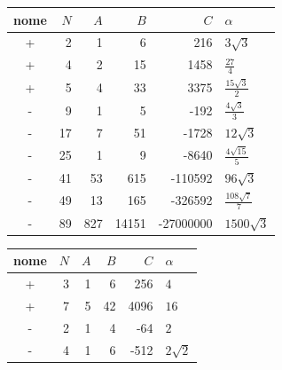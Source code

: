 \begin{identitytable}\centering\small
\caption{Standard level 3 identities, normalized by $B>0$.}
\label{tab:standard3}
\setlength{\tabcolsep}{4pt}
\renewcommand{\arraystretch}{1.15}
\begin{tabular}{@{}crrrrl@{}}\toprule
nome & $N$ & $A$ & $B$ & $C$ & $\alpha$\\\midrule
+&2&1&6&216&$3 \sqrt{3}$\\
+&4&2&15&1458&$\frac{27}{4}$\\
+&5&4&33&3375&$\frac{15 \sqrt{3}}{2}$\\
-&9&1&5&-192&$\frac{4 \sqrt{3}}{3}$\\
-&17&7&51&-1728&$12 \sqrt{3}$\\
-&25&1&9&-8640&$\frac{4 \sqrt{15}}{5}$\\
-&41&53&615&-110592&$96 \sqrt{3}$\\
-&49&13&165&-326592&$\frac{108 \sqrt{7}}{7}$\\
-&89&827&14151&-27000000&$1500 \sqrt{3}$\\
\bottomrule\end{tabular}\end{identitytable}
\begin{identitytable}\centering\small
\caption{Standard level 4 identities, normalized by $B>0$.}
\label{tab:standard4}
\setlength{\tabcolsep}{4pt}
\renewcommand{\arraystretch}{1.15}
\begin{tabular}{@{}crrrrl@{}}\toprule
nome & $N$ & $A$ & $B$ & $C$ & $\alpha$\\\midrule
+&3&1&6&256&$4$\\
+&7&5&42&4096&$16$\\
-&2&1&4&-64&$2$\\
-&4&1&6&-512&$2 \sqrt{2}$\\
\bottomrule\end{tabular}\end{identitytable}
